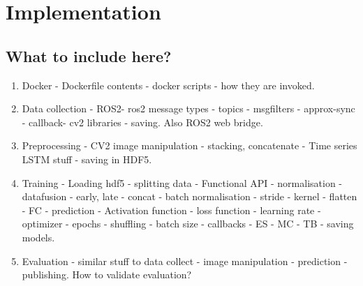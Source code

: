 \chapter{Implementation}

\section{What to include here?}

\begin{enumerate}
    \item Docker - Dockerfile contents - docker scripts - how they are invoked.
    \item Data collection - ROS2- ros2 message types - topics - msgfilters -
        approx-sync - callback- cv2 libraries - saving. Also ROS2 web bridge.
    \item Preprocessing - CV2 image manipulation - stacking, concatenate  -
        Time series LSTM stuff - saving in HDF5.
    \item Training - Loading hdf5 - splitting data - Functional API - normalisation
        - datafusion - early, late - concat - batch normalisation - stride - kernel -
        flatten - FC - prediction - Activation function - loss function - learning rate -
        optimizer - epochs - shuffling - batch size - callbacks - ES - MC - TB - saving
        models.
    \item Evaluation - similar stuff to data collect - image manipulation - prediction -
        publishing. How to validate evaluation?

\end{enumerate}
